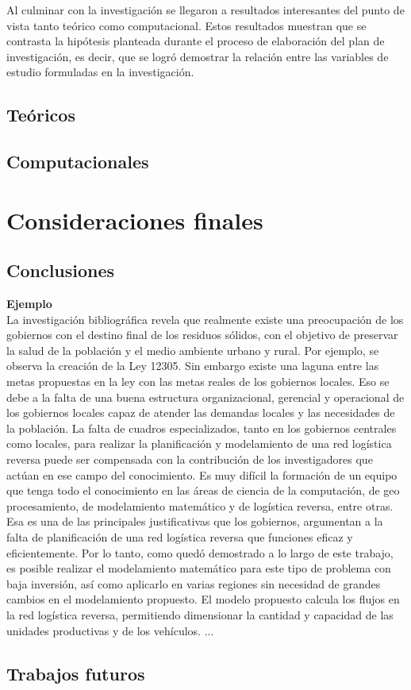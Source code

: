 Al culminar con la investigación se llegaron a resultados interesantes del punto de vista tanto teórico como computacional. Estos resultados muestran que se contrasta la hipótesis planteada durante el proceso de elaboración del plan de investigación, es decir, que se logró demostrar la relación entre las variables de estudio formuladas en la investigación.

\section{Teóricos}

\section{Computacionales}




\chapter{Consideraciones finales}


\section{Conclusiones}

{\bf Ejemplo}\\
La investigación bibliográfica revela que realmente existe una preocupación de los gobiernos con el destino final de los residuos sólidos, con el objetivo de preservar la salud de la población y el medio ambiente urbano y rural. Por ejemplo, se observa la creación de la Ley 12305. Sin embargo existe una laguna entre las metas propuestas en la ley con las metas reales de los gobiernos locales. Eso se debe a la falta de una buena estructura organizacional, gerencial y operacional de los gobiernos locales capaz de atender las demandas locales y las necesidades de la población.
\vskip 0.3cm
La falta de cuadros especializados, tanto en los gobiernos centrales como locales, para realizar la planificación y modelamiento de una red logística reversa puede ser compensada con la contribución de los investigadores que actúan en ese campo del conocimiento. Es muy difícil la formación de un equipo que tenga todo el conocimiento en las áreas de ciencia de la computación, de geo procesamiento, de modelamiento matemático y de logística reversa, entre otras. Esa es una de las principales justificativas que los gobiernos, argumentan a la falta de planificación de una red logística reversa que funciones eficaz y eficientemente. 
\vskip 0.3cm
Por lo tanto, como quedó demostrado a lo largo de este trabajo, es posible realizar el modelamiento matemático para este tipo de problema con baja inversión, así como aplicarlo en varias regiones sin necesidad de grandes cambios en el modelamiento propuesto. El modelo propuesto calcula los flujos en la red logística reversa, permitiendo dimensionar la cantidad y capacidad de las unidades productivas y de los vehículos. 
\vskip 0.3cm
...


\section{Trabajos futuros}



\cleardoublepage
{}


